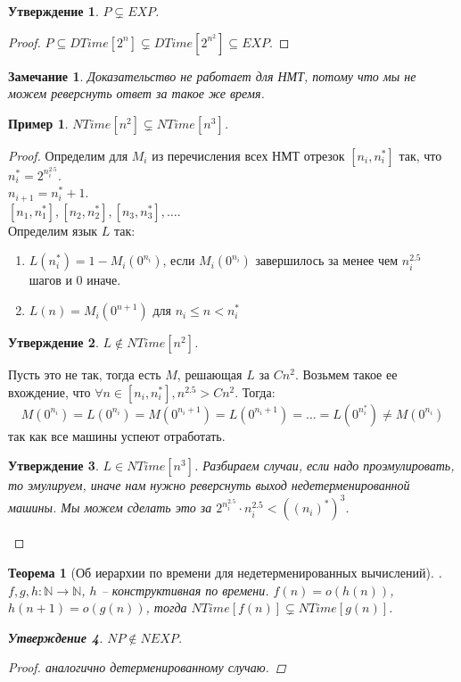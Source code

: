 \documentclass[12pt, letterpaper]{article}
\newtheorem{theorem}{Теорема}[section]
\newtheorem{prop}{Утверждение}[section]
\newtheorem{sample}{Пример}[section]
\newtheorem{note}{Замечание}[section]
\newcommand{\N}{\mathbb{N}}
\begin{document}
\begin{prop}
$P \subsetneq EXP$.
\end{prop}
\begin{proof}
$P \subseteq DTime[2^n] \subsetneq DTime[2^{n^2}] \subseteq EXP$.
\end{proof}

\begin{note}
Доказательство не работает для НМТ, потому что мы не можем реверснуть ответ за такое же время.
\end{note}

\begin{sample}
$NTime[n^2] \subsetneq NTime[n^3]$.
\end{sample}
\begin{proof}
Определим для $M_i$ из перечисления всех НМТ отрезок $[n_i, n_i^{*}]$ так, что $n_i^{*} = 2^{n_i^{2.5}}$. \\
$n_{i+1} = n_i^{*}+1$.\\
$[n_1, n_1^{*}], [n_2, n_2^{*}], [n_3, n_3^{*}], \ldots$.\\
Определим язык $L$ так:
\begin{enumerate}
\item $L(n_i^{*}) = 1 - M_i(0^{n_i})$, если $M_i(0^{n_i})$ завершилось за менее чем $n_i^{2.5}$ шагов и 0 иначе.
\item $L(n) = M_i(0^{n+1})$ для $n_i \leq n < n_i^{*}$ 
\end{enumerate}
\begin{prop}
$L \notin NTime[n^2]$.
\end{prop}
Пусть это не так, тогда есть $M$, решающая $L$ за $Cn^2$. Возьмем такое ее вхождение, что $\forall n \in [n_i, n_i^{*}], n^{2.5} > Cn^2$. Тогда:
$$M(0^{n_i}) = L(0^{n_i}) = M(0^{n_i+1}) = L(0^{n_i+1}) = \ldots = L(0^{n_i^{*}}) \neq M(0^{n_i}) $$
так как все машины успеют отработать.
\begin{prop}
$L \in NTime[n^3]$. Разбираем случаи, если надо проэмулировать, то эмулируем, иначе нам нужно реверснуть выход недетерменированной машины. Мы можем сделать это за $2^{n_i^{2.5}} \cdot n_i^{2.5} < ((n_i)^{*})^3$.
\end{prop}
\end{proof}

\begin{theorem}[Об иерархии по времени для недетерменированных вычислений].
$f,g,h : \N \rightarrow \N$, $h$ -- конструктивная по времени.
$f(n) = o(h(n))$, $h(n+1) = o(g(n))$, тогда $NTime[f(n)] \subsetneq NTime[g(n)]$.

\begin{prop}
$NP \notin NEXP$.
\end{prop}
\begin{proof} аналогично детерменированному случаю.\end{proof}

\end{theorem}
\end{document}
